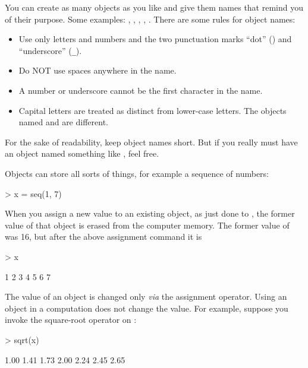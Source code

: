 You can create as many objects as you like and give them names that remind you 
of their purpose.  Some examples: , , ,
, .  There are some rules for object names:

\begin{itemize}
\item Use only letters and numbers and the two punctuation marks
  ``dot'' () and ``underscore'' (\verb+_+).
\item Do NOT use spaces anywhere in the name.
\item A number or underscore cannot be the first character in the name.
\item Capital letters are treated as distinct from lower-case letters.
  The objects named  and  are
  different.   
\end{itemize}
For the sake of readability, keep object names short.  But if you really must have an object named something like 
, feel free.

Objects can store all sorts of things, for example a sequence of numbers:
\begin{Schunk}
\begin{Sinput}
> x = seq(1, 7)
\end{Sinput}
\end{Schunk}
When you assign a new value to an existing object, as just done to
, the former value of
that object is erased from the computer memory. The former value of  was 16, but after the above assignment command it is 
\begin{Schunk}
\begin{Sinput}
> x
\end{Sinput}
\begin{Soutput}
[1] 1 2 3 4 5 6 7
\end{Soutput}
\end{Schunk}

The value of an object is changed only {\em via} the assignment
operator.  Using an object in a computation does not change the
value.  For example, suppose you invoke the square-root operator on :
\begin{Schunk}
\begin{Sinput}
> sqrt(x)
\end{Sinput}
\begin{Soutput}
[1] 1.00 1.41 1.73 2.00 2.24 2.45 2.65
\end{Soutput}
\end{Schunk}

